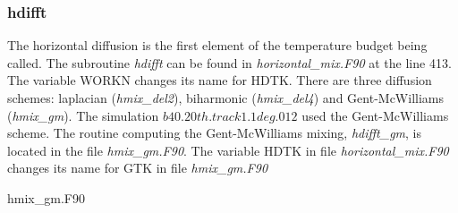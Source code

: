 \subsubsection{hdifft}

The horizontal diffusion is the first element of the temperature budget being called. The subroutine \textit{hdifft} can be found in \textit{horizontal\_mix.F90} at the line 413. The variable WORKN changes its name for HDTK. There are three diffusion schemes: laplacian (\textit{hmix\_del2}), biharmonic (\textit{hmix\_del4}) and Gent-McWilliams (\textit{hmix\_gm}). The simulation $b40.20th.track1.1deg.012$ used the Gent-McWilliams scheme. The routine computing the Gent-McWilliams mixing, \textit{hdifft\_gm}, is located in the file \textit{hmix\_gm.F90}. The variable HDTK in file \textit{horizontal\_mix.F90} changes its name for GTK in file \textit{hmix\_gm.F90}
\begin{center} hmix\_gm.F90 \end{center}
